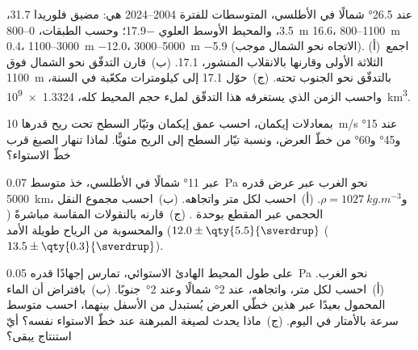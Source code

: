 \begin{exercise}[$\star$]\label{exo:b1:ocean-circulation:3}
عند \ang{26.5} شمالًا في الأطلسي، المتوسطات للفترة 2004--2024 هي: مضيق فلوريدا \qty{31.7}{\sverdrup}،  \qty{3.5}{\sverdrup}، والمحيط الأوسط العلوي \qty{-17.9}{\sverdrup}؛ وحسب الطبقات، 0--\qty{800}{m} \qty{16.6}{\sverdrup}، 800--\qty{1100}{m} \qty{0.4}{\sverdrup}، 1100--\qty{3000}{m} \qty{-12.0}{\sverdrup}، 3000--\qty{5000}{m} \qty{-5.9}{\sverdrup} (الاتجاه نحو الشمال موجب). (أ)~اجمع الثلاثة الأولى وقارنها بالانقلاب المنشور، \qty{17.1}{\sverdrup}. (ب)~قارن التدفّق نحو الشمال فوق \qty{1100}{m} بالتدفّق نحو الجنوب تحته. (ج)~حوّل \qty{17.1}{\sverdrup} إلى كيلومترات مكعّبة في السنة، واحسب الزمن الذي يستغرقه هذا التدفّق لملء حجم المحيط كله، \qty{1.3324e9}{km^3}.
\end{exercise}

\begin{exercise}[$\star$]\label{exo:b1:ocean-circulation:4}
بمعادلات إيكمان، احسب عمق إيكمان وتيّار السطح تحت ريح قدرها \qty{10}{m/s} عند \ang{15} و\ang{45} و\ang{60} من خطّ العرض، ونسبة تيّار السطح إلى الريح مئويًّا. لماذا تنهار الصيغ قرب خطّ الاستواء؟
\end{exercise}

\begin{exercise}[$\star\star$]\label{exo:b1:ocean-circulation:5}
عبر \ang{11} شمالًا في الأطلسي، خذ متوسط  \qty{0.07}{Pa} نحو الغرب عبر عرض قدره \qty{5000}{km}، و$\rho = \qty{1027}{kg.m^{-3}}$. (أ)~احسب  لكل متر واتجاهه. (ب)~احسب مجموع النقل الحجمي عبر المقطع بوحدة . (ج)~قارنه بالنقولات المقاسة مباشرةً ($12.0 \pm \qty{5.5}{\sverdrup}$) والمحسوبة من الرياح طويلة الأمد ($13.5 \pm \qty{0.3}{\sverdrup}$).
\end{exercise}

\begin{exercise}[$\star\star$]\label{exo:b1:ocean-circulation:6}
على طول المحيط الهادئ الاستوائي، تمارس  إجهادًا قدره \qty{0.05}{Pa} نحو الغرب. (أ)~احسب  لكل متر، واتجاهه، عند \ang{2} شمالًا وعند \ang{2}~جنوبًا. (ب)~بافتراض أن الماء المحمول بعيدًا عبر هذين خطّي العرض يُستبدل من الأسفل بينهما، احسب متوسط سرعة  بالأمتار في اليوم. (ج)~ماذا يحدث لصيغة المبرهنة عند خطّ الاستواء نفسه؟ أيّ استنتاج يبقى؟
\end{exercise}

